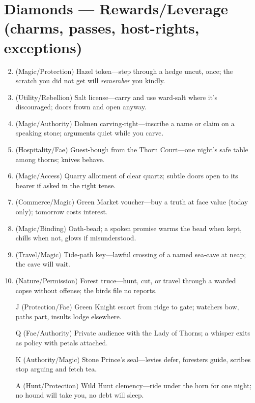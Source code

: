 \section*{Diamonds --- Rewards/Leverage (charms, passes, host-rights, exceptions)}
\label{sec:aelinnel-rewards}
\begin{enumerate}
\setcounter{enumi}{1}
\item (Magic/Protection) Hazel token---step through a hedge uncut, once; the scratch you did not get will \emph{remember} you kindly.
\item (Utility/Rebellion) Salt license---carry and use ward-salt where it's discouraged; doors frown and open anyway.
\item (Magic/Authority) Dolmen carving-right---inscribe a name or claim on a speaking stone; arguments quiet while you carve.
\item (Hospitality/Fae) Guest-bough from the Thorn Court---one night's safe table among thorns; knives behave.
\item (Magic/Access) Quarry allotment of clear quartz; subtle doors open to its bearer if asked in the right tense.
\item (Commerce/Magic) Green Market voucher---buy a truth at face value (today only); tomorrow costs interest.
\item (Magic/Binding) Oath-bead; a spoken promise warms the bead when kept, chills when not, glows if misunderstood.
\item (Travel/Magic) Tide-path key---lawful crossing of a named sea-cave at neap; the cave will wait.
\item (Nature/Permission) Forest truce---hunt, cut, or travel through a warded copse without offense; the birds file no reports.
\item[J] (Protection/Fae) Green Knight escort from ridge to gate; watchers bow, paths part, insults lodge elsewhere.
\item[Q] (Fae/Authority) Private audience with the Lady of Thorns; a whisper exits as policy with petals attached.
\item[K] (Authority/Magic) Stone Prince's seal---levies defer, foresters guide, scribes stop arguing and fetch tea.
\item[A] (Hunt/Protection) Wild Hunt clemency---ride under the horn for one night; no hound will take you, no debt will sleep.
\end{enumerate}

